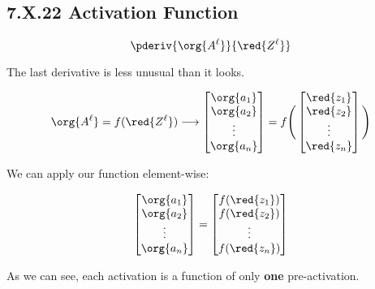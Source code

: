            
    \secdiv  
         
    \subsection*{7.X.22 \quad Activation Function}
        
        \begin{equation}
            \pderiv {\org{A^\ell}}   {\red{Z^\ell}}
        \end{equation}
    
        The last derivative is less unusual than it looks.
        
        \begin{equation}
            \org{A^\ell} = f( \red{Z^\ell} ) 
            \longrightarrow
            \begin{bmatrix}
                \org{a_1}\\ \org{a_2}\\ \vdots \\ \org{a_n}
            \end{bmatrix}
            =
            f
            \Bigg(
            \begin{bmatrix}
                \red{z_1}\\\red{z_2}\\ \vdots \\ \red{z_n}
            \end{bmatrix}
            \Bigg)
        \end{equation}
        
        We can apply our function element-wise:
        
        \begin{equation}
            \begin{bmatrix}
                \org{a_1}\\ \org{a_2}\\ \vdots \\ \org{a_n}
            \end{bmatrix}
            =
            \begin{bmatrix}
                f(\red{z_1})\\ f(\red{z_2}) \\ \vdots \\ f(\red{z_n})
            \end{bmatrix}
        \end{equation}
        
        As we can see, each activation is a function of only \textbf{one} pre-activation.\\
        
